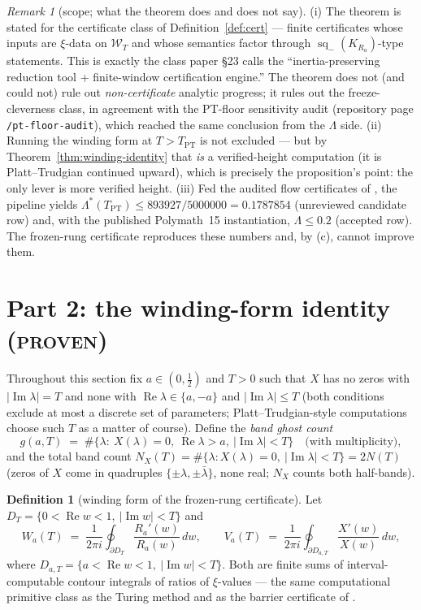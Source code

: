 \documentclass[11pt]{article}
\theoremstyle{definition}
\newtheorem{definition}[theorem]{Definition}
\theoremstyle{remark}
\newtheorem{remark}[theorem]{Remark}
\newcommand{\sq}{\operatorname{sq}_{-}}
\newcommand{\re}{\operatorname{Re}}
\newcommand{\im}{\operatorname{Im}}
\newcommand{\band}[1]{\mathcal{W}_{#1}}
\newcommand{\TPT}{T_{\mathrm{PT}}}
\begin{document}
\begin{remark}[scope; what the theorem does and does not say]\label{rem:scope}
(i) The theorem is stated for the certificate class of
Definition~\ref{def:cert} --- finite certificates whose inputs are
$\xi$-data on $\band{T}$ and whose semantics factor through
$\sq(K_{R_a})$-type statements. This is exactly the class paper \S23 calls the
``inertia-preserving reduction tool + finite-window certification engine.''
The theorem does not (and could not) rule out \emph{non-certificate} analytic
progress; it rules out the freeze-cleverness class, in agreement with the
PT-floor sensitivity audit (repository page \texttt{/pt-floor-audit}), which
reached the same conclusion from the $\Lambda$ side.
(ii) Running the winding form at $T>\TPT$ is not excluded --- but by
Theorem~\ref{thm:winding-identity} that \emph{is} a verified-height
computation (it is Platt--Trudgian continued upward), which is precisely the
proposition's point: the only lever is more verified height.
(iii) Fed the audited flow certificates of \cite{ProofNote}, the pipeline
yields $\Lambda^{*}(\TPT)\le 893927/5000000=0.1787854$ (unreviewed candidate
row) and, with the published Polymath~15 instantiation, $\Lambda\le0.2$
(accepted row). The frozen-rung certificate reproduces these numbers and, by
(c), cannot improve them.
\end{remark}

\section{Part 2: the winding-form identity (\textsc{proven})}\label{sec:winding}

Throughout this section fix $a\in(0,\tfrac12)$ and $T>0$ such that $X$ has no
zeros with $|\im\lambda|=T$ and none with $\re\lambda\in\{a,-a\}$ and
$|\im\lambda|\le T$ (both conditions exclude at most a discrete set of
parameters; Platt--Trudgian-style computations choose such $T$ as a matter of
course). Define the \emph{band ghost count}
\[
g(a,T)\;=\;\#\{\lambda:\ X(\lambda)=0,\ \re\lambda>a,\ |\im\lambda|<T\}
\quad\text{(with multiplicity)},
\]
and the total band count
$N_X(T)=\#\{\lambda: X(\lambda)=0,\ |\im\lambda|<T\}=2N(T)$ (zeros of $X$
come in quadruples $\{\pm\lambda,\pm\bar\lambda\}$, none real; $N_X$ counts
both half-bands).

\begin{definition}[winding form of the frozen-rung certificate]\label{def:winding}
Let $D_T=\{0<\re w<1,\ |\im w|<T\}$ and
\[
W_a(T)\;=\;\frac{1}{2\pi i}\oint_{\partial D_T}\frac{R_a'(w)}{R_a(w)}\,dw ,
\qquad
V_a(T)\;=\;\frac{1}{2\pi i}\oint_{\partial D_{a,T}}\frac{X'(w)}{X(w)}\,dw ,
\]
where $D_{a,T}=\{a<\re w<1,\ |\im w|<T\}$. Both are finite sums of interval-computable
contour integrals of ratios of $\xi$-values --- the same computational
primitive class as the Turing method and as the barrier certificate of
\cite{BarrierCert}.
\end{definition}
\end{document}
